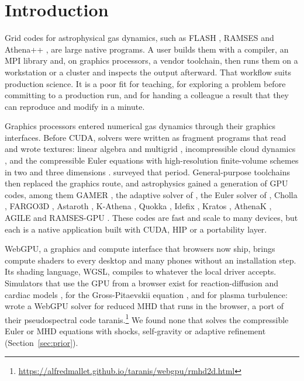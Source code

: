 \documentclass[twocolumn]{aastex701}
\begin{document}

\section{Introduction}
\label{sec:intro}

Grid codes for astrophysical gas dynamics, such as FLASH \citep{Fryxell2000}, RAMSES \citep{Teyssier2002} and Athena++ \citep{Stone2020}, are large native programs. A user builds them with a compiler, an MPI library and, on graphics processors, a vendor toolchain, then runs them on a workstation or a cluster and inspects the output afterward. That workflow suits production science. It is a poor fit for teaching, for exploring a problem before committing to a production run, and for handing a colleague a result that they can reproduce and modify in a minute.

Graphics processors entered numerical gas dynamics through their graphics interfaces. Before CUDA, solvers were written as fragment programs that read and wrote textures: linear algebra and multigrid \citep{Bolz2003, Goodnight2003, Kruger2003}, incompressible cloud dynamics \citep{Harris2003}, and the compressible Euler equations with high-resolution finite-volume schemes in two and three dimensions \citep{Hagen2006}. \citet{Owens2007} surveyed that period. General-purpose toolchains then replaced the graphics route, and astrophysics gained a generation of GPU codes, among them GAMER \citep{Schive2010, Schive2018}, the adaptive solver of \citet{Wang2010}, the Euler solver of \citet{Kestener2010}, Cholla \citep{Schneider2015}, FARGO3D \citep{BenitezLlambay2016}, Astaroth \citep{Pekkila2017}, K-Athena \citep{Grete2021}, Quokka \citep{Wibking2022}, Idefix \citep{Lesur2023}, Kratos \citep{Wang2025}, AthenaK \citep{Stone2026}, AGILE \citep{Porth2026} and RAMSES-GPU \citep{Teyssier2026}. These codes are fast and scale to many devices, but each is a native application built with CUDA, HIP or a portability layer.

WebGPU, a graphics and compute interface that browsers now ship, brings compute shaders to every desktop and many phones without an installation step. Its shading language, WGSL, compiles to whatever the local driver accepts. Simulators that use the GPU from a browser exist for reaction-diffusion and cardiac models \citep{Kaboudian2019}, for the Gross-Pitaevskii equation \citep{Baggaley2026}, and for plasma turbulence: \citet{Mallet2026} wrote a WebGPU solver for reduced MHD that runs in the browser, a port of their pseudospectral code taranis.\footnote{\url{https://alfredmallet.github.io/taranis/webgpu/rmhd2d.html}} We found none that solves the compressible Euler or MHD equations with shocks, self-gravity or adaptive refinement (Section~\ref{sec:prior}).
\end{document}
